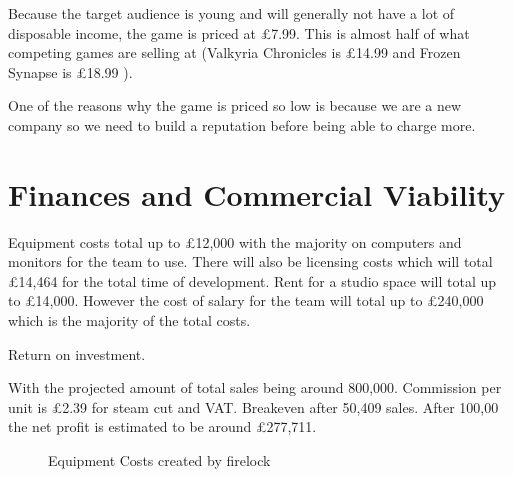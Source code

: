 \documentclass{scrartcl}
\begin{document}
Because the target audience is young and will generally not have a lot of disposable income, the game is priced at \pounds 7.99. 
This is almost half of what competing games are selling at (Valkyria Chronicles is \pounds 14.99 and Frozen Synapse is \pounds 18.99 \cite{Valkyria, Frozen}). 

One of the reasons why the game is priced so low is because we are a new company so we need to build a reputation before being able to charge more.





\section{Finances and Commercial Viability}
Equipment costs total up to \pounds 12,000 with the majority on computers and monitors for the team to use. 
There will also be licensing costs which will total \pounds 14,464 for the total time of development.
Rent for a studio space will total up to \pounds 14,000. 
However the cost of salary for the team will total up to \pounds 240,000 which is the majority of the total costs.


Return on investment.

With the projected amount of total sales being around 800,000.
Commission per unit is \pounds 2.39 for steam cut and VAT.
Breakeven after 50,409 sales.
After 100,00 the net profit is estimated to be around \pounds 277,711.




\begin{figure}[h]
	\caption{Equipment Costs created by firelock}
\end{figure}
\end{document}
